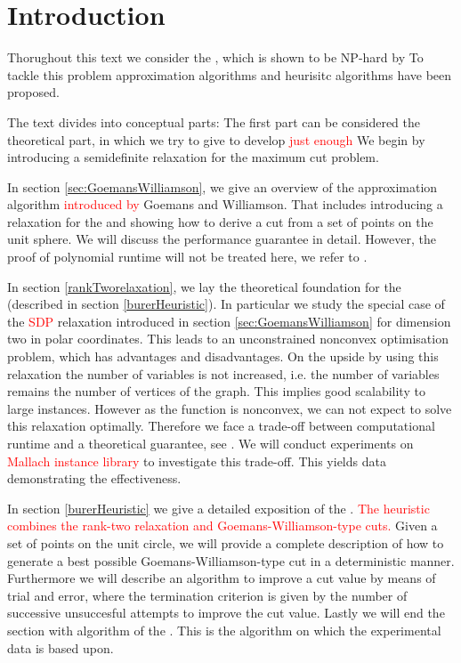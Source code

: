 \documentclass[12pt,a4paper]{article}
\theoremstyle{mythm}
\begin{document}
\tableofcontents

\section{Introduction} 
Thorughout this text we consider the \mcp, which is shown to be NP-hard by \cite{Garey1974}
To tackle this problem approximation algorithms and heurisitc algorithms have been proposed.

The text divides into conceptual parts: The first part can be considered the theoretical part, in which we try to give to develop \textcolor{red}{just enough }
We begin by introducing a semidefinite relaxation for the maximum cut problem.

In section \ref{sec:GoemansWilliamson}, we give an overview of the approximation algorithm \textcolor{red}{introduced by} Goemans and Williamson. 
That includes introducing a \sdp relaxation for the \mcp and showing how to derive a cut from a set of points on the unit sphere.
We will discuss the performance guarantee in detail. 
However, the proof of polynomial runtime will not be treated here, we refer to \cite{Korte2018}.

In section \ref{rankTworelaxation}, we lay the theoretical foundation for the \BH (described in section \ref{burerHeuristic}).
In particular we study the special case of the \textcolor{red}{SDP} relaxation introduced in section \ref{sec:GoemansWilliamson} for dimension two in polar coordinates.
This leads to an unconstrained nonconvex optimisation problem, which has advantages and disadvantages.
On the upside by using this relaxation the number of variables is not increased, 
i.e. the number of variables remains the number of vertices of the graph.
This implies good scalability to large instances.
However as the function is nonconvex, we can not expect to solve this relaxation optimally.
Therefore we face a trade-off between computational runtime and a theoretical guarantee, see \cite[p. 506]{Burer2002}.
We will conduct experiments on \textcolor{red}{Mallach instance library} to investigate this trade-off. This yields data demonstrating the effectiveness.

In section \ref{burerHeuristic} we give a detailed exposition of the \BH.
\textcolor{red}{The heuristic combines the rank-two relaxation and Goemans-Williamson-type cuts.} 
Given a set of points on the unit circle, we will provide a complete description of how to generate a best possible Goemans-Williamson-type cut in a deterministic manner. 
Furthermore we will describe an algorithm to improve a cut value by means of trial and error, where the termination criterion is given by the number of successive unsuccesful
attempts to improve the cut value.
Lastly we will end the section with algorithm of the \BH.
This is the algorithm on which the experimental data is based upon.
\end{document}
